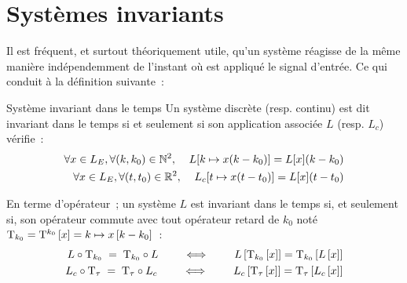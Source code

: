 
\section{Systèmes invariants}
Il est fréquent, et surtout théoriquement utile, qu'un système
réagisse de la même manière indépendemment de l'instant où est
appliqué le signal d'entrée. Ce qui conduit à la définition suivante~:
\begin{definition}{Système invariant dans le temps}
  Un système discrète (resp. continu) est dit invariant dans le temps si et seulement
  si son application associée $L$ (resp. $L_c$) vérifie~:
  \begin{eqnarray}
    \forall x\in L_E, \forall (k,k_0)\in \mathbb{N}^2, \;\;\;\; L[k\mapsto x(k-k_{0})] = L[x](k-k_{0}) \\
    \forall x\in L_E, \forall (t,t_0)\in \mathbb{R}^2, \;\;\;\; L_c[t\mapsto x(t-t_{0})] = L[x](t-t_{0}) 
  \end{eqnarray}
  
  En terme d'opérateur~;  un système $L$ est invariant dans
  le temps si, et seulement si, son opérateur commute avec  tout opérateur
  retard de $k_0$ noté $\mathrm{T}_{k_0}=\mathrm{T}^{k_0}\left[x\right]= k\mapsto x\left[k-k_0\right]$~:
  \begin{eqnarray}
    \label{eq:sys_invariant}
    L\circ\mathrm{T}_{k_0} \; = \; \mathrm{T}_{k_0}\circ L  \qquad \iff \qquad  L\left[\mathrm{T}_{k_0}\left[x\right]\right] = \mathrm{T}_{k_0}\left[L\left[x\right]\right]
    \\
    L_c\circ\mathrm{T}_{\tau} \; = \; \mathrm{T}_{\tau}\circ L_c  \qquad \iff \qquad  L_c\left[\mathrm{T}_{\tau}\left[x\right]\right] = \mathrm{T}_{\tau}\left[L_c\left[x\right]\right]
  \end{eqnarray}
\end{definition}

